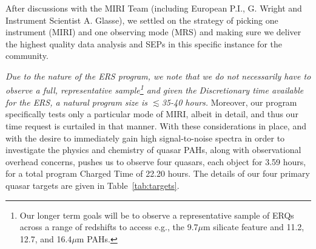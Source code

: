 \noindent
After discussions with the MIRI Team (including European P.I.,
G. Wright and Instrument Scientist A. Glasse), we settled on the
strategy of picking one instrument (MIRI) and one observing mode
(MRS) and making sure we deliver the highest quality data analysis and
SEPs in this specific instance for the community. 

\smallskip \smallskip
\noindent
{\it Due to the nature of the ERS program, we note that we do not
necessarily have to observe a full, representative sample\footnote{Our
longer term goals will be to observe a representative sample of ERQs
across a range of redshifts to access e.g., the 9.7$\mu$m silicate
feature and 11.2, 12.7, and 16.4$\mu$m PAHs.} and given the
Discretionary time available for the ERS, a natural program size is
$\lesssim$35-40 hours.}  Moreover, our program specifically tests only
a particular mode of MIRI, albeit in detail, and thus our time request
is curtailed in that manner.  With these considerations in place, and
with the desire to immediately gain high signal-to-noise spectra in
order to investigate the physics and chemistry of quasar PAHs, along
with observational overhead concerns, pushes us to observe four
quasars, each object for 3.59 hours, for a total program Charged Time
of 22.20 hours.  The details of our four primary quasar targets are
given in Table~\ref{tab:targets}.


